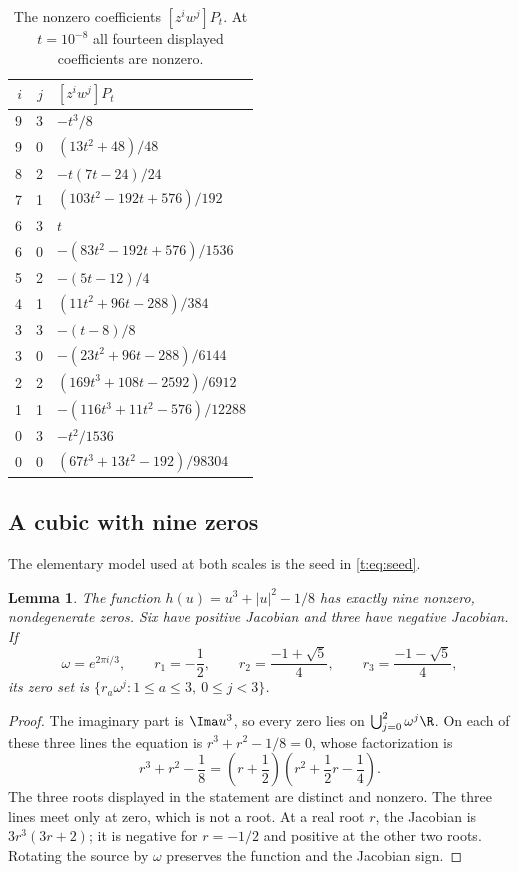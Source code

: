 \documentclass[UTF8,11pt]{ctexart}
\newtheorem{lem}[thm]{Lemma}
\theoremstyle{definition}
\numberwithin{equation}{section}
\begin{document}
\begin{table}[htbp]
\centering
\caption{The nonzero coefficients $[z^iw^j]P_t$.
At $t=10^{-8}$ all fourteen displayed coefficients are nonzero.}
\label{t:tab:coefficients}
\renewcommand{\arraystretch}{1.22}
\begin{tabular}{rrl}
\toprule
$i$ & $j$ & $[z^iw^j]P_t$\\
\midrule
9&3&$-t^3/8$\\
9&0&$(13t^2+48)/48$\\
8&2&$-t(7t-24)/24$\\
7&1&$(103t^2-192t+576)/192$\\
6&3&$t$\\
6&0&$-(83t^2-192t+576)/1536$\\
5&2&$-(5t-12)/4$\\
4&1&$(11t^2+96t-288)/384$\\
3&3&$-(t-8)/8$\\
3&0&$-(23t^2+96t-288)/6144$\\
2&2&$(169t^3+108t-2592)/6912$\\
1&1&$-(116t^3+11t^2-576)/12288$\\
0&3&$-t^2/1536$\\
0&0&$(67t^3+13t^2-192)/98304$\\
\end{tabular}
\end{table}

\subsection{A cubic with nine zeros}

The elementary model used at both scales is the seed in
\eqref{t:eq:seed}.
\begin{lem}\label{t:lem:cubic}
The function $h(u)=u^3+|u|^2-1/8$ has exactly nine nonzero,
nondegenerate zeros. Six have positive Jacobian and three have negative
Jacobian. If
\[
 \omega=e^{2\pi i/3},\qquad
 r_1=-\frac12,\qquad
 r_2=\frac{-1+\sqrt5}{4},\qquad
 r_3=\frac{-1-\sqrt5}{4},
\]
its zero set is $\{r_a\omega^j:1\le a\le3,\ 0\le j<3\}$.
\end{lem}
\begin{proof}
The imaginary part is $\Ima u^3$, so every zero lies on
$\bigcup_{j=0}^2\omega^j\R$. On each of these three lines the equation
is $r^3+r^2-1/8=0$, whose factorization is
\[
 r^3+r^2-\frac18
 =\left(r+\frac12\right)
  \left(r^2+\frac12r-\frac14\right).
\]
The three roots displayed in the statement are distinct and nonzero.
The three lines meet only at zero, which is not a root. At a real root
$r$, the Jacobian is $3r^3(3r+2)$; it is negative for $r=-1/2$ and
positive at the other two roots. Rotating the source by $\omega$
preserves the function and the Jacobian sign.
\end{proof}
\end{document}
